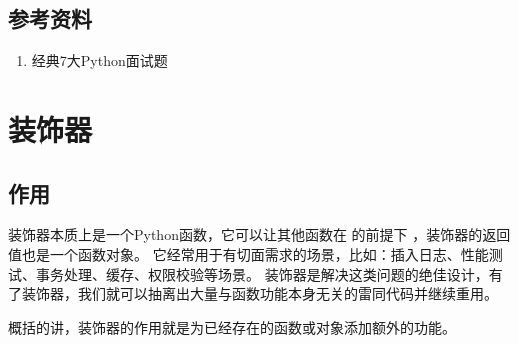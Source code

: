\documentclass[letterpaper,10pt,english]{sphinxmanual}
\begin{document}
%
\begin{sphinxVerbatim}[commandchars=\\\{\},numbers=left,firstnumber=1,stepnumber=1]
 
      
     

  
  
    
\end{sphinxVerbatim}


\subsection{参考资料}
\label{\detokenize{python/03_is:id2}}\begin{enumerate}
\item {} 
经典7大Python面试题

\end{enumerate}
\begin{quote}

\end{quote}


\section{装饰器}
\label{\detokenize{python/04_decorator::doc}}\label{\detokenize{python/04_decorator:id1}}

\subsection{作用}
\label{\detokenize{python/04_decorator:id2}}
装饰器本质上是一个Python函数，它可以让其他函数在  的前提下  ，装饰器的返回值也是一个函数对象。
它经常用于有切面需求的场景，比如：插入日志、性能测试、事务处理、缓存、权限校验等场景。
装饰器是解决这类问题的绝佳设计，有了装饰器，我们就可以抽离出大量与函数功能本身无关的雷同代码并继续重用。

概括的讲，装饰器的作用就是为已经存在的函数或对象添加额外的功能。
\end{document}
